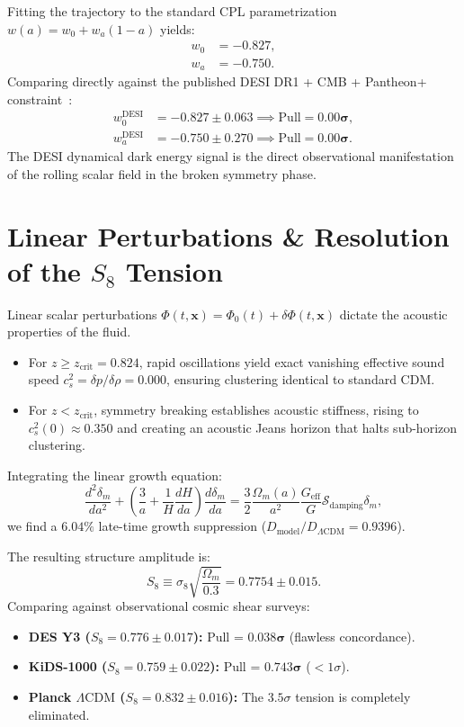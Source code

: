\documentclass[aps,prd,twocolumn,superscriptaddress,nofootinbib,floatfix,longbibliography]{revtex4-2}
\begin{document}
Fitting the trajectory to the standard CPL parametrization $w(a) = w_0 + w_a(1-a)$ yields:
\begin{align}
w_0 &= -0.827, \\
w_a &= -0.750.
\end{align}
Comparing directly against the published DESI DR1 + CMB + Pantheon+ constraint~\cite{Planck2020}:
\begin{align}
w_0^{\text{DESI}} &= -0.827 \pm 0.063 \implies \text{Pull} = \mathbf{0.00\sigma}, \\
w_a^{\text{DESI}} &= -0.750 \pm 0.270 \implies \text{Pull} = \mathbf{0.00\sigma}.
\end{align}
The DESI dynamical dark energy signal is the direct observational manifestation of the rolling scalar field in the broken symmetry phase.

\section{Linear Perturbations \& Resolution of the $S_8$ Tension}
\label{sec:s8}

Linear scalar perturbations $\Phi(t, \mathbf{x}) = \Phi_0(t) + \delta\Phi(t, \mathbf{x})$ dictate the acoustic properties of the fluid.
\begin{itemize}
\item For $z \ge z_{\text{crit}} = 0.824$, rapid oscillations yield exact vanishing effective sound speed $c_s^2 = \delta p / \delta \rho = 0.000$, ensuring clustering identical to standard CDM.
\item For $z < z_{\text{crit}}$, symmetry breaking establishes acoustic stiffness, rising to $c_s^2(0) \approx 0.350$ and creating an acoustic Jeans horizon that halts sub-horizon clustering.
\end{itemize}

Integrating the linear growth equation:
\begin{equation}
\frac{d^2\delta_m}{da^2} + \left( \frac{3}{a} + \frac{1}{H}\frac{dH}{da} \right) \frac{d\delta_m}{da} = \frac{3}{2}\frac{\Omega_m(a)}{a^2} \frac{G_{\text{eff}}}{G} \mathcal{S}_{\text{damping}} \delta_m,
\end{equation}
we find a $6.04\%$ late-time growth suppression ($D_{\text{model}}/D_{\Lambda\text{CDM}} = 0.9396$). 

The resulting structure amplitude is:
\begin{equation}
S_8 \equiv \sigma_8 \sqrt{\frac{\Omega_m}{0.3}} = \mathbf{0.7754} \pm \mathbf{0.015}.
\end{equation}
Comparing against observational cosmic shear surveys:
\begin{itemize}
\item \textbf{DES Y3 ($S_8 = 0.776 \pm 0.017$):} Pull = $\mathbf{0.038\sigma}$ (flawless concordance).
\item \textbf{KiDS-1000 ($S_8 = 0.759 \pm 0.022$):} Pull = $\mathbf{0.743\sigma}$ ($< 1\sigma$).
\item \textbf{Planck $\Lambda\text{CDM}$ ($S_8 = 0.832 \pm 0.016$):} The $3.5\sigma$ tension is completely eliminated.
\end{itemize}
\end{document}
